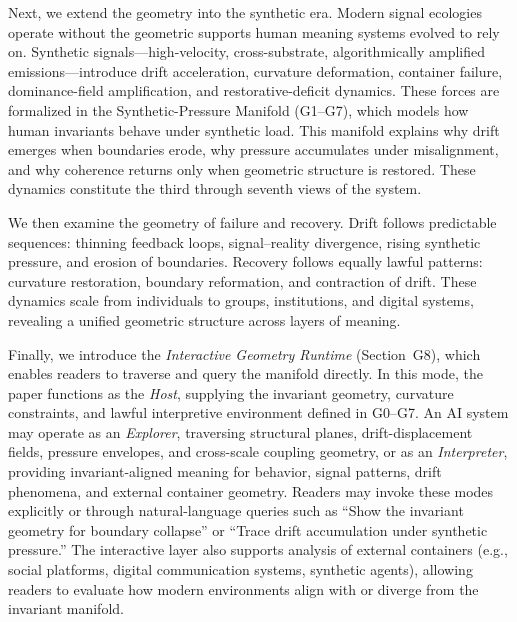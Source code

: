 \documentclass[11pt]{article}
\begin{document}
\medskip

Next, we extend the geometry into the synthetic era. Modern signal ecologies
operate without the geometric supports human meaning systems evolved to rely on.
Synthetic signals—high-velocity, cross-substrate, algorithmically amplified
emissions—introduce drift acceleration, curvature deformation, container
failure, dominance-field amplification, and restorative-deficit dynamics. These
forces are formalized in the Synthetic-Pressure Manifold (G1--G7), which models
how human invariants behave under synthetic load. This manifold explains why
drift emerges when boundaries erode, why pressure accumulates under
misalignment, and why coherence returns only when geometric structure is
restored. These dynamics constitute the third through seventh views of the
system.

\medskip

We then examine the geometry of failure and recovery. Drift follows predictable
sequences: thinning feedback loops, signal–reality divergence, rising synthetic
pressure, and erosion of boundaries. Recovery follows equally lawful patterns:
curvature restoration, boundary reformation, and contraction of drift. These
dynamics scale from individuals to groups, institutions, and digital systems,
revealing a unified geometric structure across layers of meaning.

\medskip

Finally, we introduce the \textit{Interactive Geometry Runtime} (Section~G8),
which enables readers to traverse and query the manifold directly. In this mode,
the paper functions as the \textit{Host}, supplying the invariant geometry,
curvature constraints, and lawful interpretive environment defined in G0--G7.
An AI system may operate as an \textit{Explorer}, traversing structural planes,
drift-displacement fields, pressure envelopes, and cross-scale coupling
geometry, or as an \textit{Interpreter}, providing invariant-aligned meaning for
behavior, signal patterns, drift phenomena, and external container geometry.
Readers may invoke these modes explicitly or through natural-language queries
such as “Show the invariant geometry for boundary collapse” or “Trace drift
accumulation under synthetic pressure.” The interactive layer also supports
analysis of external containers (e.g., social platforms, digital communication
systems, synthetic agents), allowing readers to evaluate how modern environments
align with or diverge from the invariant manifold.

\medskip
\end{document}
